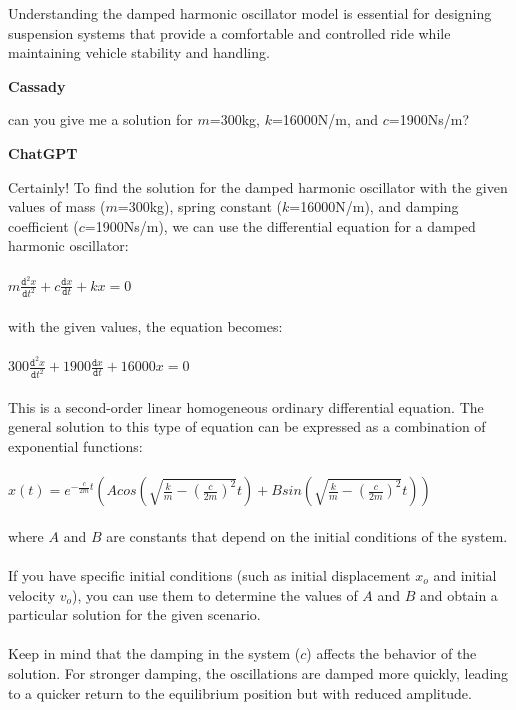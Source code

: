 \documentclass{article}
\begin{document}
\begin{enumerate}
    Understanding the damped harmonic oscillator model is essential for designing suspension systems that provide a comfortable and controlled ride while maintaining vehicle stability and handling.
\end{enumerate}

\begin{center}
    \textbf{Cassady}
\end{center}

can you give me a solution for $m$=300kg, $k$=16000N/m, and $c$=1900Ns/m? 

\begin{center}
    \textbf{ChatGPT}
\end{center}

Certainly! To find the solution for the damped harmonic oscillator with the given values of mass ($m$=300kg), spring constant ($k$=16000N/m), and damping coefficient ($c$=1900Ns/m), we can use the differential equation for a damped harmonic oscillator:\\
\\
$m\frac{\texttt{d}^2x}{\texttt{d}t^2}+c\frac{\texttt{d}x}{\texttt{d}t}+kx=0$\\
\\
with the given values, the equation becomes:\\
\\
$300\frac{\texttt{d}^2x}{\texttt{d}t^2}+1900\frac{\texttt{d}x}{\texttt{d}t}+16000x=0$\\
\\
This is a second-order linear homogeneous ordinary differential equation. The general solution to this type of equation can be expressed as a combination of exponential functions:\\
\\
$x(t)=e^{ -\frac{c}{2m}t } \left( Acos \left( \sqrt{ \frac{k}{m}-\left(\frac{c}{2m}\right)^2 }t \right) + Bsin \left( \sqrt{ \frac{k}{m} - \left( \frac{c}{2m} \right)^2}t \right) \right)$\\
\\
where $A$ and $B$ are constants that depend on the initial conditions of the system.\\
\\
If you have specific initial conditions (such as initial displacement $x_o$ and initial velocity $v_o$), you can use them to determine the values of $A$ and $B$ and obtain a particular solution for the given scenario.\\
\\
Keep in mind that the damping in the system ($c$) affects the behavior of the solution. For stronger damping, the oscillations are damped more quickly, leading to a quicker return to the equilibrium position but with reduced amplitude.
\end{document}
